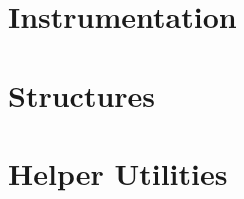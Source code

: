 \documentclass{article}
\begin{document}
\section{Instrumentation}
\label{instrumentation}


\section{Structures}
\label{structures}


\section{Helper Utilities}
\label{helpers}





\end{document}
